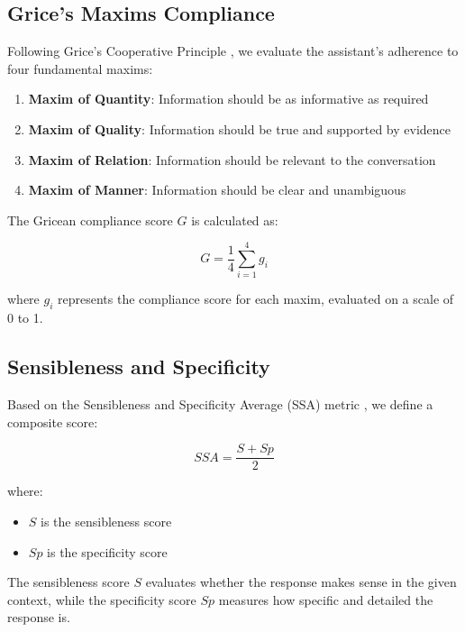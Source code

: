 \documentclass[12pt]{article}
\begin{document}
\subsection{Grice's Maxims Compliance}

Following Grice's Cooperative Principle \cite{grice1975logic}, we evaluate the assistant's adherence to four fundamental maxims:

\begin{enumerate}
    \item \textbf{Maxim of Quantity}: Information should be as informative as required
    \item \textbf{Maxim of Quality}: Information should be true and supported by evidence
    \item \textbf{Maxim of Relation}: Information should be relevant to the conversation
    \item \textbf{Maxim of Manner}: Information should be clear and unambiguous
\end{enumerate}

The Gricean compliance score $G$ is calculated as:

\begin{equation}
    G = \frac{1}{4}\sum_{i=1}^{4} g_i
\end{equation}

where $g_i$ represents the compliance score for each maxim, evaluated on a scale of 0 to 1.

\subsection{Sensibleness and Specificity}

Based on the Sensibleness and Specificity Average (SSA) metric \cite{adolphs2020evaluation}, we define a composite score:

\begin{equation}
    SSA = \frac{S + Sp}{2}
\end{equation}

where:
\begin{itemize}
    \item $S$ is the sensibleness score
    \item $Sp$ is the specificity score
\end{itemize}

The sensibleness score $S$ evaluates whether the response makes sense in the given context, while the specificity score $Sp$ measures how specific and detailed the response is.
\end{document}
